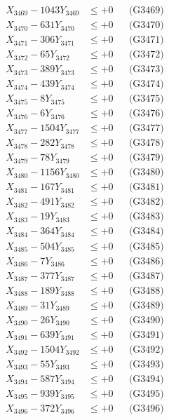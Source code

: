 \documentclass[a4paper,10pt]{article}
\begin{document}
{\begin{align}
X_{3469} - 1043Y_{3469} &\leq +0 && \text{(G3469)} \\
X_{3470} - 631Y_{3470} &\leq +0 && \text{(G3470)} \\
\allowbreak
X_{3471} - 306Y_{3471} &\leq +0 && \text{(G3471)} \\
X_{3472} - 65Y_{3472} &\leq +0 && \text{(G3472)} \\
X_{3473} - 389Y_{3473} &\leq +0 && \text{(G3473)} \\
X_{3474} - 439Y_{3474} &\leq +0 && \text{(G3474)} \\
X_{3475} - 8Y_{3475} &\leq +0 && \text{(G3475)} \\
X_{3476} - 6Y_{3476} &\leq +0 && \text{(G3476)} \\
X_{3477} - 1504Y_{3477} &\leq +0 && \text{(G3477)} \\
X_{3478} - 282Y_{3478} &\leq +0 && \text{(G3478)} \\
X_{3479} - 78Y_{3479} &\leq +0 && \text{(G3479)} \\
X_{3480} - 1156Y_{3480} &\leq +0 && \text{(G3480)} \\
\allowbreak
X_{3481} - 167Y_{3481} &\leq +0 && \text{(G3481)} \\
X_{3482} - 491Y_{3482} &\leq +0 && \text{(G3482)} \\
X_{3483} - 19Y_{3483} &\leq +0 && \text{(G3483)} \\
X_{3484} - 364Y_{3484} &\leq +0 && \text{(G3484)} \\
X_{3485} - 504Y_{3485} &\leq +0 && \text{(G3485)} \\
X_{3486} - 7Y_{3486} &\leq +0 && \text{(G3486)} \\
X_{3487} - 377Y_{3487} &\leq +0 && \text{(G3487)} \\
X_{3488} - 189Y_{3488} &\leq +0 && \text{(G3488)} \\
X_{3489} - 31Y_{3489} &\leq +0 && \text{(G3489)} \\
X_{3490} - 26Y_{3490} &\leq +0 && \text{(G3490)} \\
\allowbreak
X_{3491} - 639Y_{3491} &\leq +0 && \text{(G3491)} \\
X_{3492} - 1504Y_{3492} &\leq +0 && \text{(G3492)} \\
X_{3493} - 55Y_{3493} &\leq +0 && \text{(G3493)} \\
X_{3494} - 587Y_{3494} &\leq +0 && \text{(G3494)} \\
X_{3495} - 939Y_{3495} &\leq +0 && \text{(G3495)} \\
X_{3496} - 372Y_{3496} &\leq +0 && \text{(G3496)} \\

\end{align}}
\end{document}

